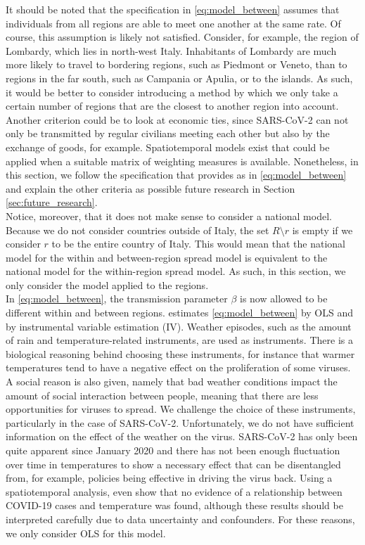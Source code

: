 \documentclass[12pt]{article}
\begin{document}
	It should be noted that the specification in \eqref{eq:model_between} assumes that individuals from all regions are able to meet one another at the same rate. Of course, this assumption is likely not satisfied. Consider, for example, the region of Lombardy, which lies in north-west Italy. Inhabitants of Lombardy are much more likely to travel to bordering regions, such as Piedmont or Veneto, than to regions in the far south, such as Campania or Apulia, or to the islands. As such, it would be better to consider introducing a method by which we only take a certain number of regions that are the closest to another region into account. Another criterion could be to look at economic ties, since SARS-CoV-2 can not only be transmitted by regular civilians meeting each other but also by the exchange of goods, for example. Spatiotemporal models exist that could be applied when a suitable matrix of weighting measures is available. Nonetheless, in this section, we follow the specification that \textcite{adda2016economic} provides as in \eqref{eq:model_between} and explain the other criteria as possible future research in Section \ref{sec:future_research}. \\
	
	Notice, moreover, that it does not make sense to consider a national model. Because we do not consider countries outside of Italy, the set $R \setminus r$ is empty if we consider $r$ to be the entire country of Italy. This would mean that the national model for the within and between-region spread model is equivalent to the national model for the within-region spread model. As such, in this section, we only consider the model applied to the regions. \\
	
	In \eqref{eq:model_between}, the transmission parameter $\beta$ is now allowed to be different within and between regions. \textcite{adda2016economic} estimates \eqref{eq:model_between} by OLS and by instrumental variable estimation (IV). Weather episodes, such as the amount of rain and temperature-related instruments, are used as instruments. There is a biological reasoning behind choosing these instruments, for instance that warmer temperatures tend to have a negative effect on the proliferation of some viruses. A social reason is also given, namely that bad weather conditions impact the amount of social interaction between people, meaning that there are less opportunities for viruses to spread. We challenge the choice of these instruments, particularly in the case of SARS-CoV-2. Unfortunately, we do not have sufficient information on the effect of the weather on the virus. SARS-CoV-2 has only been quite apparent since January 2020 and there has not been enough fluctuation over time in temperatures to show a necessary effect that can be disentangled from, for example, policies being effective in driving the virus back. Using a spatiotemporal analysis, \textcite{briz2020temperature} even show that no evidence of a relationship between COVID-19 cases and temperature was found, although these results should be interpreted carefully due to data uncertainty and confounders. For these reasons, we only consider OLS for this model. \\
	
\end{document}
